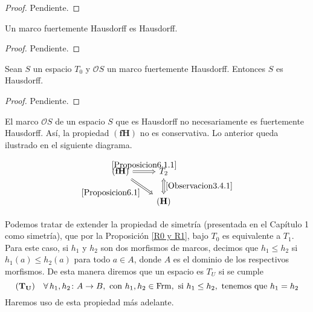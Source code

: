 \begin{proof}
    Pendiente.
\end{proof}

\begin{prop}\label{Proposicion6.1}
    Un marco fuertemente Hausdorff es Hausdorff.
\end{prop}

\begin{proof}
    Pendiente.
\end{proof}

\begin{prop}\label{Proposicion6.1.1}
    Sean $S$ un espacio $T_0$ y $\mathcal{O}S$ un marco fuertemente Hausdorff. Entonces $S$ es Hausdorff.
\end{prop}

\begin{proof}
    Pendiente.
\end{proof}

El marco $\mathcal{O}S$ de un espacio $S$ que es Hausdorff no necesariamente es fuertemente Hausdorff. Así, la propiedad $\mathbf{(fH)}$ no es conservativa. Lo anterior queda ilustrado en el siguiente diagrama.

\[\begin{tikzcd}
	{\mathbf{(fH)}} & {T_2} \\
	& {\mathbf{(H)}}
	\arrow["{\ref{Proposicion6.1.1}}", Rightarrow, from=1-1, to=1-2]
	\arrow["{\ref{Proposicion6.1}}"', Rightarrow, from=1-1, to=2-2]
	\arrow["{\ref{Observacion3.4.1}}", Leftrightarrow, from=1-2, to=2-2]
\end{tikzcd}\]

\newpage
Podemos tratar de extender la propiedad de simetría (presentada en el Capítulo 1 como simetría), que por la Proposición \ref{R0 y R1}, bajo $T_0$ es equivalente a $T_1$. Para este caso, si $h_1$ y $h_2$ son dos morfismos de marcos, decimos que $h_1\leq h_2$ si $h_1(a)\leq h_2(a)$ para todo $a\in A$, donde $A$ es el dominio de los respectivos morfismos. De esta manera diremos que un espacio es $T_U$ si se cumple
\[
(\mathbf{T_U})\quad \forall\, h_1, h_2\colon A\to B, \mbox{ con } h_1,h_2\in \mathrm{Frm}, \mbox{ si } h_1\leq h_2, \mbox{ tenemos que }
h_1=h_2
\]
Haremos uso de esta propiedad más adelante.

